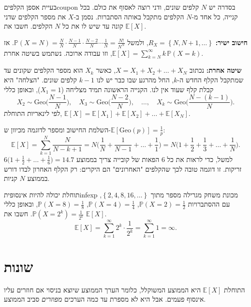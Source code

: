 \documentclass[11pt,a4paper]{report}
\newcommand{\flag}{\tikz[baseline=-0.1ex,x=0.9ex,y=0.9ex]{\draw[line width=0.5pt] (0,-0.3)--(0,1.6); \fill (0,1.6)--(1.2,1.2)--(0,0.8)--cycle;}}
\newcounter{todo}
\newcommand{\addtodo}[1]{\refstepcounter{todo}%
  \addcontentsline{tdo}{todo}{\protect\numberline{\thetodo}#1}}
\newcommand{\needcheck}[1]{\addtodo{#1}%
  {\color{todoc}\sffamily\small\,[\textbf{\flag{}\,\thetodo\ לבדיקה:} #1]\,}}
\renewcommand{\needcheck}[1]{}
\newcommand{\set}[1]{\left\{#1\right\}}
\newcommand{\PP}{\mathbb{P}}
\newcommand{\E}{\mathbb{E}}
\newcommand{\Geo}{\mathrm{Geo}}
\begin{document}
\begin{example}{בעיית אספן הקלפים}{coupon}
בסדרה יש $N$ קלפים שונים, ודני רוצה לאסוף את כולם. בכל קנייה, כל אחד מ-$N$ הקלפים מתקבל באותה הסתברות. נסמן ב-$X$ את מספר הקלפים שדני קונה עד שיש לו את כל $N$ הקלפים. חשבו את $\E[X]$.

\textbf{חישוב ישיר:} $R_X=\set{N,N+1,\dots}$, ולמשל
$\PP(X=N)=\frac NN\cdot\frac{N-1}N\cdot\frac{N-2}N\cdots\frac1N=\frac{N!}{N^N}$. אז $\E[X]=\sum_{k=N}^\infty k\,\PP(X=k)$, וזו עבודה ארוכה. נשתמש בשיטה אחרת.

\textbf{שיטה אחרת:} נכתוב $X=X_1+X_2+\dots+X_N$, כאשר $X_k$ הוא מספר הקלפים שקונים עד שמתקבל הקלף החדש ה-$k$, החל מהרגע שבו כבר יש לנו $k-1$ קלפים שונים. "הצלחה" היא קבלת קלף שעוד אין לנו. הקנייה הראשונה תמיד מצליחה ($X_1=1$), ובאופן כללי
\[
  X_2\sim\Geo\Big(\frac{N-1}N\Big),\quad X_3\sim\Geo\Big(\frac{N-2}N\Big),\quad\dots,\quad X_k\sim\Geo\Big(\frac{N-(k-1)}N\Big).
\]
לפי לינאריות התוחלת, $\E[X]=\E[X_1]+\E[X_2]+\dots+\E[X_N]$.
\needcheck{ברשימות נכתב $X_k\sim\Geo(\frac{N-k-1}{N})$; תיקנתי ל-$\frac{N-k+1}{N}$ (בדיקה: $k=2$ נותן $\frac{N-1}{N}$). כמו כן החישוב לא הושלם ברשימות}
\end{example}

\begin{suggestion}{השלמת החישוב ומספר לדוגמה}
מכיוון ש-$\E[\Geo(p)]=\frac1p$:
\[
  \E[X]=\sum_{k=1}^N\frac{N}{N-k+1}=N\Big(\frac1N+\frac1{N-1}+\dots+\frac11\Big)=N\Big(1+\frac12+\frac13+\dots+\frac1N\Big).
\]
למשל, כדי לראות את כל 6 הפאות של קובייה צריך בממוצע $6\big(1+\frac12+\dots+\frac16\big)=14.7$ זריקות. זו דוגמה טובה לכך שהקלפים "האחרונים" הם היקרים: רק הקלף האחרון לבדו דורש בממוצע $N$ קניות.
\end{suggestion}

\begin{example}{תוחלת יכולה להיות אינסופית}{infexp}
מכונת משחק מגרילה מספר מתוך $\set{2,4,8,16,\dots}$, עם ההסתברויות $\PP(X=2)=\frac12$, $\PP(X=4)=\frac14$, $\PP(X=8)=\frac18$, ובאופן כללי $\PP(X=2^k)=\frac1{2^k}$. חשבו את $\E[X]$.
\[
  \E[X]=\sum_{k=1}^\infty2^k\cdot\frac1{2^k}=\sum_{k=1}^\infty1=\infty.
\]
\end{example}

\section{שונות}

התוחלת $\E[X]$ היא הממוצע המשוקלל, כלומר הערך הממוצע שיוצא בניסוי אם חוזרים עליו אינסוף פעמים. אבל היא לא מספרת עד כמה הערכים \emph{מפוזרים} סביב הממוצע.
\end{document}
